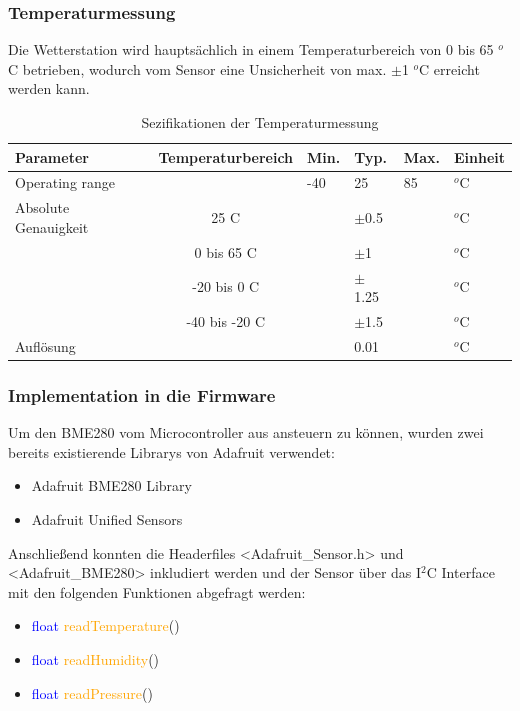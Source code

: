 \subsubsection*{Temperaturmessung}
Die Wetterstation wird hauptsächlich in einem Temperaturbereich von 0 bis 65 $^{o}$C betrieben, wodurch vom Sensor eine Unsicherheit von max. $\pm$1 $^{o}$C erreicht werden kann. \\
\begin{table}[htbp]
  \centering
  \caption{Sezifikationen der Temperaturmessung \cite{Bosch2019}}
    \begin{tabular}{llllll}
    \toprule
    \textbf{Parameter} & \multicolumn{1}{l}{\textbf{Temperaturbereich}} & \multicolumn{1}{l}{\textbf{Min.}} & \textbf{Typ. } & \multicolumn{1}{l}{\textbf{Max.}} & \textbf{Einheit} \\
    \midrule
    Operating range &       & \multicolumn{1}{l}{-40} & 25    & \multicolumn{1}{l}{85} & $^{o}$C \\
    Absolute Genauigkeit & \multicolumn{1}{c}{25 C} &       & $\pm$0.5 &       & $^{o}$C \\
          & \multicolumn{1}{c}{0 bis 65 C} &       & $\pm$1  &       & $^{o}$C \\
          & \multicolumn{1}{c}{-20 bis 0 C} &       & $\pm$1.25 &       & $^{o}$C \\
          & \multicolumn{1}{c}{-40 bis -20 C} &       & $\pm$1.5 &       & $^{o}$C \\
    Auflösung  &       &       & 0.01  &       & $^{o}$C \\
    \bottomrule
    \end{tabular}%
  \label{tab:spez_temp}%
\end{table}%

\subsubsection*{Implementation in die Firmware}
Um den BME280 vom Microcontroller aus ansteuern zu können, wurden zwei bereits existierende Librarys von Adafruit verwendet:
\begin{itemize}
\item Adafruit BME280 Library
\item Adafruit Unified Sensors
\end{itemize}
Anschließend konnten die Headerfiles <Adafruit\_Sensor.h> und <Adafruit\_BME280> inkludiert werden und der Sensor über das I$^{2}$C Interface mit den folgenden Funktionen abgefragt werden:\\
\begin{itemize}
\item \textcolor{blue}{float} \textcolor{orange}{readTemperature}()
\item \textcolor{blue}{float} \textcolor{orange}{readHumidity}()
\item \textcolor{blue}{float} \textcolor{orange}{readPressure}()
\end{itemize}